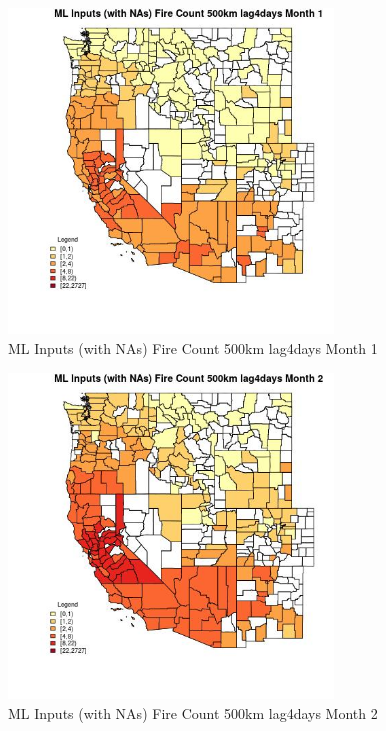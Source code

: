 \begin{figure} 
\centering  
\includegraphics[width=0.77\textwidth]{Code_Outputs/Report_ML_input_PM25_Step4_part_f_de_duplicated_aveswNAs_CountyFire_Count_500km_lag4daysmedianMonth1.jpg} 
\caption{\label{fig:Report_ML_input_PM25_Step4_part_f_de_duplicated_aveswNAsCountyFire_Count_500km_lag4daysmedianMonth1}ML Inputs (with NAs) Fire Count 500km lag4days Month 1} 
\end{figure} 
 

\begin{figure} 
\centering  
\includegraphics[width=0.77\textwidth]{Code_Outputs/Report_ML_input_PM25_Step4_part_f_de_duplicated_aveswNAs_CountyFire_Count_500km_lag4daysmedianMonth2.jpg} 
\caption{\label{fig:Report_ML_input_PM25_Step4_part_f_de_duplicated_aveswNAsCountyFire_Count_500km_lag4daysmedianMonth2}ML Inputs (with NAs) Fire Count 500km lag4days Month 2} 
\end{figure} 
 

